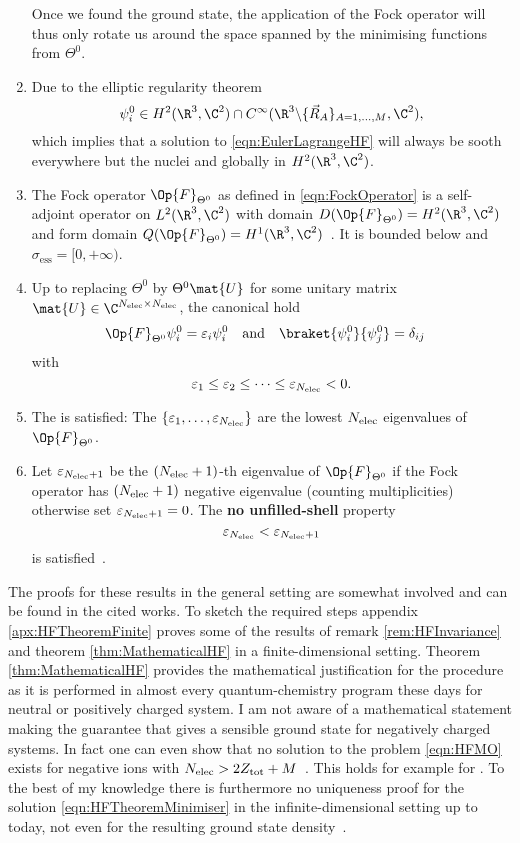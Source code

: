 \begin{thm}
\begin{enumerate}
			Once we found the ground state, the application of the Fock operator
			will thus only rotate us around the space spanned by the minimising
			functions from $\Theta^0$.
		\item Due to the elliptic regularity theorem~\cite{Lieb1977}
			\[ \psi_i^0 \in H^2(\R^3,\C^2) \cap C^\infty(\R^3 \backslash \{\vec{R}_A\}_{A=1,\ldots,M},\C^2), \]
			which implies that a solution to \eqref{eqn:EulerLagrangeHF}
			will always be sooth everywhere but the nuclei and globally in $H^2(\R^3,\C^2)$.
		\item The Fock operator $\Op{F}_{\Theta^0}$ as defined in \eqref{eqn:FockOperator}
			is a self-adjoint operator on $L^2(\R^3,\C^2)$
			with domain $D(\Op{F}_{\Theta^0}) = H^2(\R^3,\C^2)$
			and form domain $Q(\Op{F}_{\Theta^0}) = H^1(\R^3,\C^2)$~\cite{Lions1987}.
			It is bounded below and $\sigma_\text{ess} =[0, +\infty)$.
		\item Up to replacing $\Theta^0$ by $\Theta^0 \mat{U}$
			for some unitary matrix $\mat{U} \in \C^{\Nelec\times\Nelec}$,
			the canonical  hold
			\begin{align}
				\label{eqn:HFequations}
				\Op{F}_{\Theta^0} \psi_i^0 &= \varepsilon_i \psi_i^0
				&&\text{and}&
				\braket{\psi_i^0}{\psi_j^0} &= \delta_{ij}
			\end{align}
			with
			\[ \varepsilon_1 \leq \varepsilon_2 \leq \cdots \leq \varepsilon_{N_\text{elec}} < 0. \]
		\item The  is satisfied:
			The $\{\varepsilon_1, \ldots,\varepsilon_{N_\text{elec}} \}$
			are the lowest $N_\text{elec}$ eigenvalues of $\Op{F}_{\Theta^0}$.
		\item Let $\varepsilon_{N_\text{elec}+1}$ be the $(N_\text{elec}+1)$-th eigenvalue of $\Op{F}_{\Theta^0}$
			if the Fock operator has $(N_\text{elec}+1)$ negative eigenvalue (counting multiplicities)
			otherwise set $\varepsilon_{N_\text{elec}+1} = 0$.
			The \textbf{no unfilled-shell} property
			\[ \varepsilon_{N_\text{elec}} < \varepsilon_{N_\text{elec}+1} \]
			is satisfied~.
	\end{enumerate}
\end{thm}
The proofs for these results in the general setting are somewhat involved
and can be found in the cited works.
To sketch the required steps appendix \vref{apx:HFTheoremFinite}
proves some of the results of remark \ref{rem:HFInvariance}
and theorem \ref{thm:MathematicalHF} in a finite-dimensional setting.
Theorem \ref{thm:MathematicalHF} provides the mathematical
justification for the \HF procedure as it is performed
in almost every quantum-chemistry program these days
for neutral or positively charged system.
I am not aware of a mathematical statement making
the guarantee that \HF gives a sensible ground state for negatively charged systems.
In fact one can even show that no solution to the \HF problem \eqref{eqn:HFMO}
exists for negative ions with $N_\text{elec} > 2Z_\text{tot} + M$~\cite{Cances2000}.
This holds for example for .
To the best of my knowledge there is furthermore no
uniqueness proof for the solution \eqref{eqn:HFTheoremMinimiser}
in the infinite-dimensional setting up to today,
not even for the resulting ground state density~\cite{Cances2000}.

